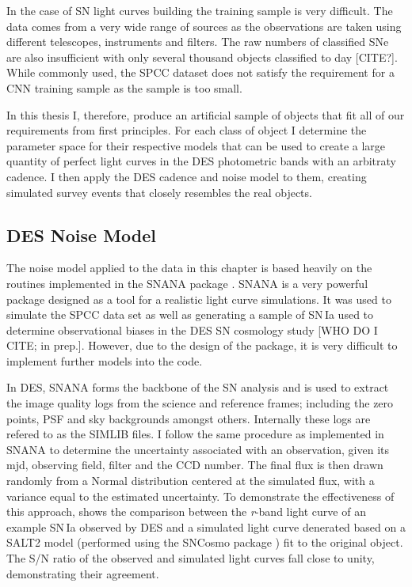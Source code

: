 In the case of SN light curves building the training sample is very difficult. The data comes from a very wide range of sources as the observations are taken using different telescopes, instruments and filters. The raw numbers of classified SNe are also insufficient with only several thousand objects classified to day [CITE?]. While commonly used, the SPCC dataset does not satisfy the requirement for a CNN training sample as the sample is too small.

In this thesis I, therefore, produce an artificial sample of objects that fit all of our requirements from first principles. For each class of object I determine the parameter space for their respective models that can be used to create a large quantity of perfect light curves in the DES photometric bands with an arbitraty cadence. I then apply the DES cadence and noise model to them, creating simulated survey events that closely resembles the real objects.

\subsection{DES Noise Model} \label{sec:NoiseModel}
The noise model applied to the data in this chapter is based heavily on the routines implemented in the SNANA package \citep{Kessler2009}. SNANA is a very powerful package designed as a tool for a realistic light curve simulations. It was used to simulate the SPCC data set \citep{Kessler2010} as well as generating a sample of SN\,Ia used to determine observational biases in the DES SN cosmology study [WHO DO I CITE; in prep.]. However, due to the design of the package, it is very difficult to implement further models into the code.

In DES, SNANA forms the backbone of the SN analysis and is used to extract the image quality logs from the science and reference frames; including the zero points, PSF and sky backgrounds amongst others. Internally these logs are refered to as the \textsc{SIMLIB} files. I follow the same procedure as implemented in SNANA to determine the uncertainty associated with an observation, given its mjd, observing field, filter and the CCD number. The final flux is then drawn randomly from a Normal distribution centered at the simulated flux, with a variance equal to the estimated uncertainty. To demonstrate the effectiveness of this approach,  shows the comparison between the \textit{r}-band light curve of an example SN\,Ia observed by DES and a simulated light curve denerated based on a SALT2 model (performed using the SNCosmo package \citep{Barbary2014}) fit to the original object. The S/N ratio of the observed and simulated light curves fall close to unity, demonstrating their agreement.

